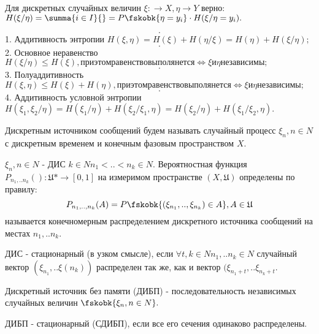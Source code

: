 \begin{proofs}
Для дискретных случайных величин $\xi: \to X,  \eta \to Y $ верно:
$H(\xi / \eta) = \summa{i\in I}{} = P \fskobk{\eta=y_i} \cdot H(\xi/\eta = y_i).$
\end{proofs}  

\begin{proofs}
$$.$$
1. Аддитивность энтропии $H(\xi, \eta) = H(\xi) + H(\eta/\xi) = H(\eta) + H(\xi / \eta);$
$$.$$
2. Основное неравенство $H(\xi / \eta) \leq H(\xi), при этом равенство выполянется \Leftrightarrow \xi и \eta независимы;$
$$.$$
3. Полуаддитивность $H(\xi, \eta) \leq H(\xi) + H(\eta), при этом равенство выполянется \Leftrightarrow \xi и \eta независимы;$
$$.$$
4. Аддитивность условной энтропии $H(\xi_1, \xi_2 / \eta) = H(\xi_1 / \eta) + H(\xi_2 / \xi_1, \eta) = H(\xi_2 / \eta) + H(\xi_1 / \xi_2, \eta).$
\end{proofs}

\begin{defs}
Дискретным источником сообщений будем называть случайный процесс $ {\xi_n, n \in N}$ с дискретным временем и конечным фазовым пространством $X$.
\end{defs}

\begin{defs}
 ${\xi_n, n \in N}$ - ДИС $k \in N n_1<..<n_k \in N.$ Вероятностная функция $P_{n_1,..n_k}():\mathfrak{U}* \to [0,1]$ на измеримом пространстве $(X, \mathfrak{U})$ определены по правилу:
$$P_{n_1,..,n_k}(A)=P \fskobk{(\xi_{n_1},..,\xi_{n_k})\in A}, A \in \mathfrak{U}$$ 
называется конечномерным распределением дискретного источника сообщений на местах $n_1,..n_k.$
\end{defs}

\begin{defs}
ДИС - стационарный (в узком смысле), если $\forall t,k \in N n_1,..n_k \in N$ случайный вектор $(\xi_{n_1},..\xi(n_k))$ распределен так же, как и вектор $(\xi_{n_1 + t},..\xi_{n_k + t}.$
\end{defs}

\begin{defs}
Дискретный источник без памяти (ДИБП) - последовательность независимых случайных величин  $\fskobk{\xi_n, n \in N}.$
\end{defs}

\begin{defs}
ДИБП - стационарный (СДИБП), если все его сечения одинаково распределены.
\end{defs}

